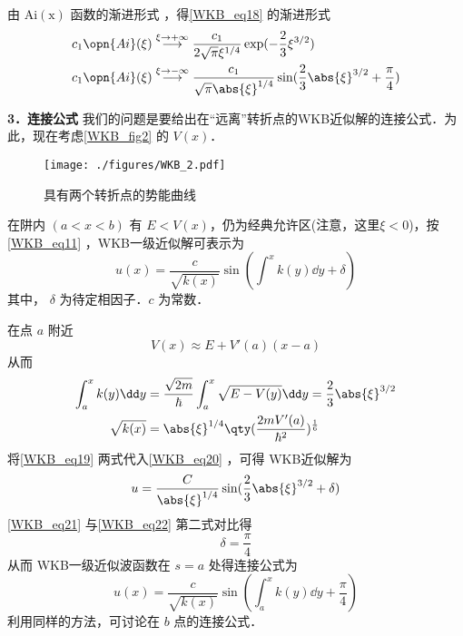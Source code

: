 由 $\mathrm{Ai(x)}$ 函数的渐进形式 ，得\autoref{WKB_eq18} 的渐进形式
\begin{equation}\label{WKB_eq22}
\begin{aligned}
&c_1\opn{Ai}(\xi) \overset{\xi \to +\infty}{\longrightarrow} \frac{c_1}{2\sqrt{\pi} \xi^{1/4}} \exp(-\frac{2}{3}\xi^{3/2})\\
&c_1\opn{Ai}(\xi) \overset{\xi \to -\infty}{\longrightarrow} \frac{c_1}{\sqrt{\pi} \abs{\xi}^{1/4}} \sin(\frac{2}{3}\abs{\xi}^{3/2}+\frac{\pi}{4})\\
\end{aligned}
\end{equation}

\textbf{3．连接公式}
我们的问题是要给出在“远离”转折点的WKB近似解的连接公式．为此，现在考虑\autoref{WKB_fig2} 的 $V(x)$．
\begin{figure}[ht]
\centering
\texttt{[image: ./figures/WKB\_2.pdf]}
\caption{具有两个转折点的势能曲线} \label{WKB_fig2}
\end{figure}
在阱内 $(a<x<b)$ 有 $E<V(x)$，仍为经典允许区(注意，这里$\xi<0$)，按\autoref{WKB_eq11} ，WKB一级近似解可表示为
\begin{equation}\label{WKB_eq20}
u(x)=\frac{c}{\sqrt{k(x)}}\sin(\int^x k(y)\dd y+\delta)
\end{equation}
其中， $\delta$ 为待定相因子．$c$ 为常数．

在点 $a$ 附近
\begin{equation}
V(x)\approx E+V'(a)(x-a)
\end{equation}
从而
\begin{equation}\label{WKB_eq19}
\begin{aligned}
\int_a^xk(y)\dd y&=
\frac{\sqrt{2m}}{\hbar}\int_a^x\sqrt{E-V(y)}\dd y=\frac{2}{3}\abs{\xi}^{3/2}
\\
\sqrt{k(x)}
&=
\abs{\xi}^{1/4}\qty(\frac{2mV'(a)}{\hbar^2})^{\frac{1}{6}}
\end{aligned}
\end{equation}
将\autoref{WKB_eq19} 两式代入\autoref{WKB_eq20} ，可得 WKB近似解为
\begin{equation}\label{WKB_eq21}
u=
\frac{C}{\abs{\xi}^{1/4}}\sin({\frac{2}{3}\abs{\xi}^{3/2}+\delta})
\end{equation}
\autoref{WKB_eq21} 与\autoref{WKB_eq22} 第二式对比得
\begin{equation}
\delta=\frac{\pi}{4}
\end{equation}
从而 WKB一级近似波函数在 $s=a$ 处得连接公式为
\begin{equation}
u(x)=\frac{c}{\sqrt{k(x)}}\sin(\int_a^x k(y)\dd y+\frac{\pi}{4})
\end{equation}
利用同样的方法，可讨论在 $b$ 点的连接公式．
